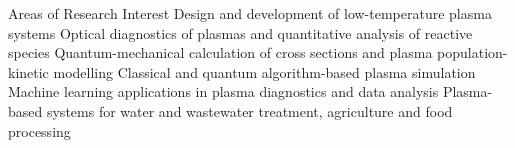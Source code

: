 \begin{rubric}{Areas of Research Interest}
\entry*[] Design and development of low-temperature plasma systems
\entry*[] Optical diagnostics of plasmas and quantitative analysis of reactive species
\entry*[] Quantum-mechanical calculation of cross sections and plasma population-kinetic modelling
\entry*[] Classical and quantum algorithm-based plasma simulation
\entry*[] Machine learning applications in plasma diagnostics and data analysis
\entry*[] Plasma-based systems for water and wastewater treatment, agriculture and food processing
\end{rubric}
